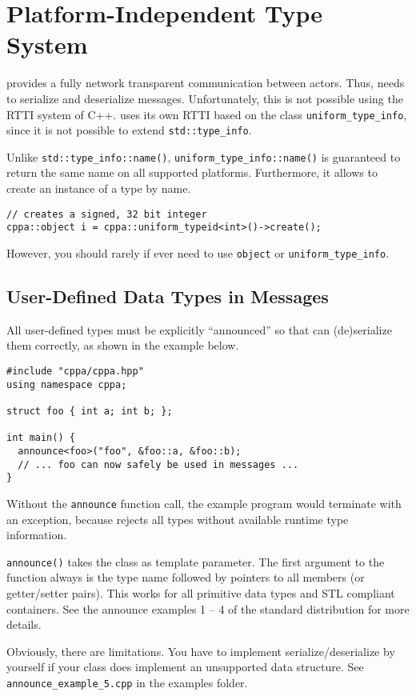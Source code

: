 \section{Platform-Independent Type System}
\label{Sec::TypeSystem}

\lib provides a fully network transparent communication between actors.
Thus, \lib needs to serialize and deserialize messages.
Unfortunately, this is not possible using the RTTI system of C++.
\lib uses its own RTTI based on the class \lstinline^uniform_type_info^, since it is not possible to extend \lstinline^std::type_info^.

Unlike \lstinline^std::type_info::name()^, \lstinline^uniform_type_info::name()^ is guaranteed to return the same name on all supported platforms. Furthermore, it allows to create an instance of a type by name.

\begin{lstlisting}
// creates a signed, 32 bit integer
cppa::object i = cppa::uniform_typeid<int>()->create();
\end{lstlisting}

However, you should rarely if ever need to use \lstinline^object^ or \lstinline^uniform_type_info^.

\subsection{User-Defined Data Types in Messages}
\label{Sec::TypeSystem::UserDefined}

All user-defined types must be explicitly ``announced'' so that \lib can (de)serialize them correctly, as shown in the example below.

\begin{lstlisting}
#include "cppa/cppa.hpp"
using namespace cppa;

struct foo { int a; int b; };

int main() {
  announce<foo>("foo", &foo::a, &foo::b);
  // ... foo can now safely be used in messages ...
}
\end{lstlisting}

Without the \lstinline^announce^ function call, the example program would terminate with an exception, because \lib rejects all types without available runtime type information.

\lstinline^announce()^ takes the class as template parameter.
The first argument to the function always is the type name followed by pointers to all members (or getter/setter pairs).
This works for all primitive data types and STL compliant containers.
See the announce examples 1 -- 4 of the standard distribution for more details.

Obviously, there are limitations.
You have to implement serialize/deserialize by yourself if your class does implement an unsupported data structure.
See \lstinline^announce_example_5.cpp^ in the examples folder.
